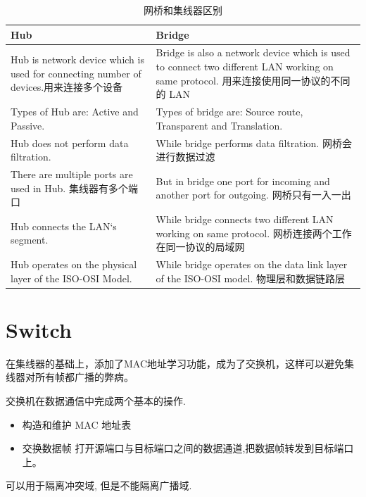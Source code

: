 \documentclass[a4paper]{report}
\begin{document}
\begin{table}[htbp]
  \centering
    \begin{tabularx}{\textwidth}{XX}
      \hline
    \textbf{Hub} & \textbf{Bridge} \\
    \hline
    Hub is network device which is used for connecting number of devices.\newline 用来连接多个设备  & Bridge is also a network device which is used to connect two different LAN working on same protocol. \newline 用来连接使用同一协议的不同的 LAN \\
    \hdashline
    Types of Hub are: Active and Passive. & Types of bridge are: Source route, Transparent and Translation. \\
    \hdashline
    Hub does not perform data filtration. & While bridge performs data filtration. \newline 网桥会进行数据过滤 \\
    \hdashline
    There are multiple ports are used in Hub. \newline 集线器有多个端口 & But in bridge one port for incoming and another port for outgoing. \newline 网桥只有一入一出 \\
    \hdashline
    Hub connects the LAN`s segment. & While bridge connects two different LAN working on same protocol. \newline 网桥连接两个工作在同一协议的局域网\\
    \hdashline
    Hub operates on the physical layer of the ISO-OSI Model. & While bridge operates on the data link layer of the ISO-OSI model. \newline 物理层和数据链路层 \\
    \hline
    \end{tabularx}%
  \caption{网桥和集线器区别}
\end{table}%


\section{Switch}
在集线器的基础上，添加了MAC地址学习功能，成为了交换机，这样可以避免集线器对所有帧都广播的弊病。

交换机在数据通信中完成两个基本的操作. 
\begin{itemize}
  \item 构造和维护 MAC 地址表
  \item 交换数据帧
  \subitem 打开源端口与目标端口之间的数据通道,把数据帧转发到目标端口上。 
\end{itemize}
可以用于隔离冲突域, 但是不能隔离广播域. 
\end{document}
